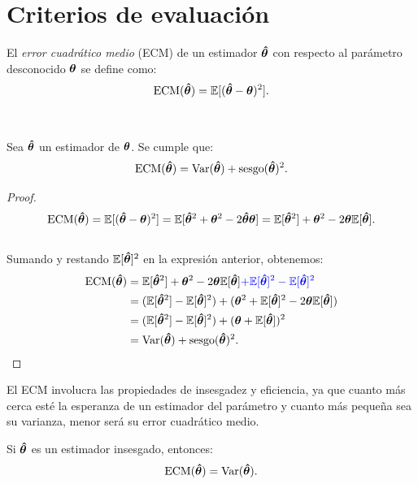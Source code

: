 \documentclass[oneside,openright,titlepage,numbers=noenddot,openany,headinclude,footinclude=true,
cleardoublepage=empty,abstractoff,BCOR=5mm,paper=a4,fontsize=12pt,main=spanish]{scrreprt}
\begin{document}
\clearpage

\section{Criterios de evaluación} \label{sec:coeficientedet}

\begin{definition}
El \textit{error cuadrático medio} (ECM) de un estimador $\bm{\hat{\theta}}$ con respecto al parámetro desconocido $\bm{\theta}$  se define como: $$\text{ECM}(\bm{\hat{\theta}})=\mathbb{E}[(\bm{\hat{\theta}}-\bm{\theta})^2].$$
\end{definition}\

\begin{proposition}
Sea $\bm{\hat{\theta}}$ un estimador de $\bm{\theta}$. Se cumple que:
$$\text{ECM}(\bm{\hat{\theta}})=\text{Var}(\bm{\hat{\theta}})+\text{sesgo}(\bm{\hat{\theta}})^2.$$
\end{proposition}

\begin{proof}
 $$\text{ECM}(\bm{\hat{\theta}})=\mathbb{E}[(\bm{\hat{\theta}}-\bm{\theta})^2]=\mathbb{E}[\bm{\hat{\theta}}^2+\bm{\theta}^2-2\bm{\hat{\theta}} \bm{\theta}]=\mathbb{E}[\bm{\hat{\theta}}^2]+\bm{\theta}^2-2\bm{\theta}\mathbb{E}[\bm{\hat{\theta}}].$$\\
Sumando y restando $\mathbb{E}[\bm{\hat{\theta}}]^2$ en la expresión anterior, obtenemos:\\
  \begin{equation*}
  \begin{split}
 \text{ECM}(\bm{\hat{\theta}})&=\mathbb{E}[\bm{\hat{\theta}}^2]+\bm{\theta}^2-2\bm{\theta}\mathbb{E}[\bm{\hat{\theta}}]\textcolor{blue}{+\mathbb{E}[\bm{\hat{\theta}}]^2-\mathbb{E}[\bm{\hat{\theta}}]^2}\\
 &=(\mathbb{E}[\bm{\hat{\theta}}^2]-\mathbb{E}[\bm{\hat{\theta}}]^2)+(\bm{\theta}^2+\mathbb{E}[\bm{\hat{\theta}}]^2-2\bm{\theta}\mathbb{E}[\bm{\hat{\theta}}])\\
 &=(\mathbb{E}[\bm{\hat{\theta}}^2]-\mathbb{E}[\bm{\hat{\theta}}]^2)+(\bm{\theta}+\mathbb{E}[\bm{\hat{\theta}}])^2\\
 &=\text{Var}(\bm{\hat{\theta}})+\text{sesgo}(\bm{\hat{\theta}})^2.
  \end{split}
  \end{equation*} 
\end{proof}

El ECM involucra las propiedades de insesgadez y
eficiencia, ya que cuanto más cerca esté la esperanza de un estimador del parámetro y cuanto más pequeña sea su varianza, menor será su error cuadrático medio.\\

\begin{proposition} \label{prop:varecm}
Si $\bm{\hat{\theta}}$ es un estimador insesgado, entonces: $$\text{ECM}(\bm{\hat{\theta}})=\text{Var}(\bm{\hat{\theta}}).$$ 
\end{proposition}\
\end{document}
